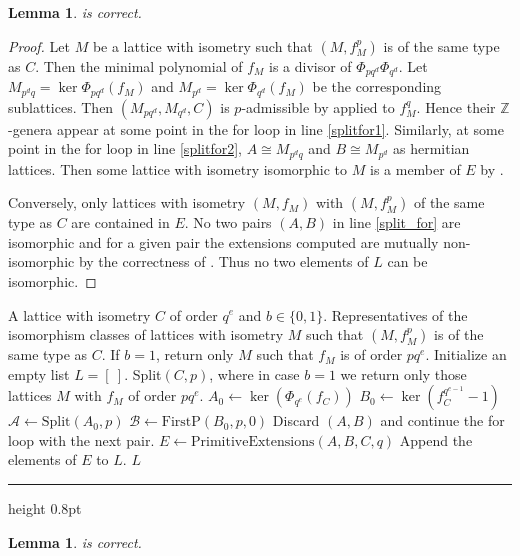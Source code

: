 \documentclass[a4paper]{amsart}
\makeatletter
\theoremstyle{definition}
\theoremstyle{plain}
\newtheorem{lemma}[definition]{Lemma}
\DeclareMathOperator{\ord}{ord}
\newcommand{\ZZ}{\mathbb{Z}}
\newcommand{\B}{\mathcal{B}}
\newcommand{\A}{\mathcal{A}}
\def\hrulefill{\leavevmode\leaders\hrule height 0.8pt\hfill\kern\z@}
\makeatother
\begin{document}
\begin{lemma}
  is correct.
\end{lemma}
\begin{proof}
Let $M$ be a lattice with isometry such that $(M,f^p_M)$ is of the same type as $C$. Then the minimal polynomial of $f_M$ is a divisor of
$\Phi_{pq^d}\Phi_{q^d}$. Let $M_{p^dq}=\ker \Phi_{pq^d}(f_M)$ and $M_{p^d}=\ker \Phi_{q^d}(f_M)$ be the corresponding sublattices. Then $(M_{pq^d},M_{q^d},C)$ is $p$-admissible by  applied to $f_M^q$.
Hence their $\ZZ$-genera appear at some point in the for loop in line \ref{splitfor1}.
Similarly, at some point in the for loop in line \ref{splitfor2}, $A \cong M_{p^dq}$ and $B\cong M_{p^d}$ as hermitian lattices. Then some lattice with isometry isomorphic to $M$ is a member of $E$ by .

  Conversely, only lattices with isometry $(M,f_M)$ with $(M,f_M^p)$ of the same type as $C$ are contained in $E$.
No two pairs $(A,B)$ in line \ref{split_for} are isomorphic and for a given pair the extensions computed  are mutually non-isomorphic by the correctness of .
Thus no two elements of $L$ can be isomorphic.
\end{proof}


\begingroup
{}\label{FirstP}
\endgroup
\begin{algorithmic}[1]
\REQUIRE A lattice with isometry $C$ of order $q^e$ and $b \in \{0,1\}$.
  \ENSURE Representatives of the isomorphism classes of lattices with isometry $M$ such that $(M,f_M^p)$ is of the same type as $C$. If $b=1$, return only $M$ such that $f_M$ is of order $pq^e$.
\STATE Initialize an empty list $L = [\ ]$.
\RETURN Split$(C, p)$, where in case $b = 1$ we return only those lattices $M$ with $f_M$ of order $pq^e$. \label{firstp_e0}
\ENDIF
\STATE $A_0 \gets \ker(\Phi_{q^e}(f_C))$ \label{firstp1}
\STATE $B_0 \gets \ker(f_C^{q^{e-1}}-1)$ \label{firstp2}
\STATE $\A \gets  \mbox{Split}(A_0, p)$
  \STATE $\B \gets  \mbox{FirstP}(B_0,p, 0)$
\FOR{$(A,B) \in \A \times \B$} \label{firstpAB}
    \IF {$b=1$ and $p \nmid \ord(f_A)$ and $p \nmid \ord(f_B)$}
        \STATE Discard $(A,B)$ and continue the for loop with the next pair.
    \ENDIF
    \STATE $E \gets \mbox{PrimitiveExtensions}(A,B,C,q)$
    \STATE Append the elements of $E$ to $L$.
\ENDFOR
\RETURN $L$
\end{algorithmic}\hrulefill\\

\begin{lemma}
  is correct.
\end{lemma}
\end{document}
